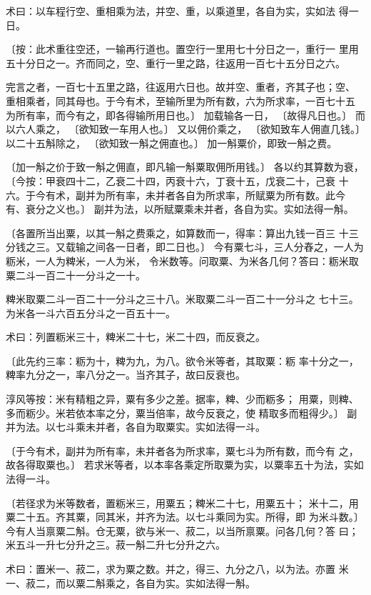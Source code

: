 \documentclass[12pt,UTF8]{ctexbook}
\begin{document}
术曰：以车程行空、重相乘为法，并空、重，以乘道里，各自为实，实如法 得一日。

〔按：此术重往空还，一输再行道也。置空行一里用七十分日之一，重行一 里用五十分日之一。齐而同之，空、重行一里之路，往返用一百七十五分日之六。

完言之者，一百七十五里之路，往返用六日也。故并空、重者，齐其子也；空、 重相乘者，同其母也。于今有术，至输所里为所有数，六为所求率，一百七十五 为所有率，而今有之，即各得输所用日也。〕 加载输各一日， 〔故得凡日也。〕 而以六人乘之， 〔欲知致一车用人也。〕 又以佣价乘之， 〔欲知致车人佣直几钱。〕 以二十五斛除之， 〔欲知致一斛之佣直也。〕 加一斛粟价，即致一斛之费。

〔加一斛之价于致一斛之佣直，即凡输一斛粟取佣所用钱。〕 各以约其算数为衰， 〔今按：甲衰四十二，乙衰二十四，丙衰十六，丁衰十五，戊衰二十，己衰 十六。于今有术，副并为所有率，未并者各自为所求率，所赋粟为所有数。此今 有、衰分之义也。〕 副并为法，以所赋粟乘未并者，各自为实。实如法得一斛。

〔各置所当出粟，以其一斛之费乘之，如算数而一，得率：算出九钱一百三 十三分钱之三。又载输之间各一日者，即二日也。〕 今有粟七斗，三人分舂之，一人为粝米，一人为粺米，一人为米， 令米数等。问取粟、为米各几何？答曰：粝米取粟二斗一百二十一分斗之一十。

粺米取粟二斗一百二十一分斗之三十八。米取粟二斗一百二十一分斗之 七十三。为米各一斗六百五分斗之一百五十一。

术曰：列置粝米三十，粺米二十七，米二十四，而反衰之。

〔此先约三率：粝为十，粺为九，为八。欲令米等者，其取粟：粝 率十分之一，粺率九分之一，率八分之一。当齐其子，故曰反衰也。

淳风等按：米有精粗之异，粟有多少之差。据率，粺、少而粝多； 用粟，则粺、多而粝少。米若依本率之分，粟当倍率，故今反衰之，使 精取多而粗得少。〕 副并为法。以七斗乘未并者，各自为取粟实。实如法得一斗。

〔于今有术，副并为所有率，未并者各为所求率，粟七斗为所有数，而今有 之，故各得取粟也。〕 若求米等者，以本率各乘定所取粟为实，以粟率五十为法，实如法得一斗。

〔若径求为米等数者，置粝米三，用粟五；粺米二十七，用粟五十； 米十二，用粟二十五。齐其粟，同其米，并齐为法。以七斗乘同为实。所得，即 为米斗数。〕 今有人当禀粟二斛。仓无粟，欲与米一、菽二，以当所禀粟。问各几何？答 曰；米五斗一升七分升之三。菽一斛二升七分升之六。

术曰：置米一、菽二，求为粟之数。并之，得三、九分之八，以为法。亦置 米一、菽二，而以粟二斛乘之，各自为实。实如法得一斛。
\end{document}
